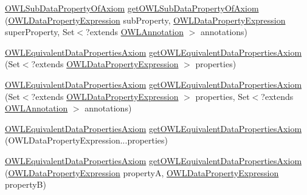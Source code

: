 \begin{DoxyCompactItemize}
\item 
\hyperlink{interfaceorg_1_1semanticweb_1_1owlapi_1_1model_1_1_o_w_l_sub_data_property_of_axiom}{O\-W\-L\-Sub\-Data\-Property\-Of\-Axiom} \hyperlink{interfaceorg_1_1semanticweb_1_1owlapi_1_1model_1_1_o_w_l_data_factory_ab33727917abbca90eba617f9aa0ad82d}{get\-O\-W\-L\-Sub\-Data\-Property\-Of\-Axiom} (\hyperlink{interfaceorg_1_1semanticweb_1_1owlapi_1_1model_1_1_o_w_l_data_property_expression}{O\-W\-L\-Data\-Property\-Expression} sub\-Property, \hyperlink{interfaceorg_1_1semanticweb_1_1owlapi_1_1model_1_1_o_w_l_data_property_expression}{O\-W\-L\-Data\-Property\-Expression} super\-Property, Set$<$?extends \hyperlink{interfaceorg_1_1semanticweb_1_1owlapi_1_1model_1_1_o_w_l_annotation}{O\-W\-L\-Annotation} $>$ annotations)
\item 
\hyperlink{interfaceorg_1_1semanticweb_1_1owlapi_1_1model_1_1_o_w_l_equivalent_data_properties_axiom}{O\-W\-L\-Equivalent\-Data\-Properties\-Axiom} \hyperlink{interfaceorg_1_1semanticweb_1_1owlapi_1_1model_1_1_o_w_l_data_factory_ae452b8a05c3fdc7cb8f75fb8d79e7a73}{get\-O\-W\-L\-Equivalent\-Data\-Properties\-Axiom} (Set$<$?extends \hyperlink{interfaceorg_1_1semanticweb_1_1owlapi_1_1model_1_1_o_w_l_data_property_expression}{O\-W\-L\-Data\-Property\-Expression} $>$ properties)
\item 
\hyperlink{interfaceorg_1_1semanticweb_1_1owlapi_1_1model_1_1_o_w_l_equivalent_data_properties_axiom}{O\-W\-L\-Equivalent\-Data\-Properties\-Axiom} \hyperlink{interfaceorg_1_1semanticweb_1_1owlapi_1_1model_1_1_o_w_l_data_factory_a388e63fa6cf129fb4b4c01b1efad9bae}{get\-O\-W\-L\-Equivalent\-Data\-Properties\-Axiom} (Set$<$?extends \hyperlink{interfaceorg_1_1semanticweb_1_1owlapi_1_1model_1_1_o_w_l_data_property_expression}{O\-W\-L\-Data\-Property\-Expression} $>$ properties, Set$<$?extends \hyperlink{interfaceorg_1_1semanticweb_1_1owlapi_1_1model_1_1_o_w_l_annotation}{O\-W\-L\-Annotation} $>$ annotations)
\item 
\hyperlink{interfaceorg_1_1semanticweb_1_1owlapi_1_1model_1_1_o_w_l_equivalent_data_properties_axiom}{O\-W\-L\-Equivalent\-Data\-Properties\-Axiom} \hyperlink{interfaceorg_1_1semanticweb_1_1owlapi_1_1model_1_1_o_w_l_data_factory_a5306a3adce6c839e14e135a0599d9532}{get\-O\-W\-L\-Equivalent\-Data\-Properties\-Axiom} (O\-W\-L\-Data\-Property\-Expression...\-properties)
\item 
\hyperlink{interfaceorg_1_1semanticweb_1_1owlapi_1_1model_1_1_o_w_l_equivalent_data_properties_axiom}{O\-W\-L\-Equivalent\-Data\-Properties\-Axiom} \hyperlink{interfaceorg_1_1semanticweb_1_1owlapi_1_1model_1_1_o_w_l_data_factory_a0ead508aff0d986358367be95c16a0c6}{get\-O\-W\-L\-Equivalent\-Data\-Properties\-Axiom} (\hyperlink{interfaceorg_1_1semanticweb_1_1owlapi_1_1model_1_1_o_w_l_data_property_expression}{O\-W\-L\-Data\-Property\-Expression} property\-A, \hyperlink{interfaceorg_1_1semanticweb_1_1owlapi_1_1model_1_1_o_w_l_data_property_expression}{O\-W\-L\-Data\-Property\-Expression} property\-B)

\end{DoxyCompactItemize}
